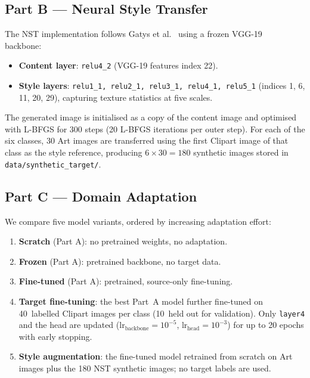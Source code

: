 \documentclass[conference]{IEEEtran}
\begin{document}
\subsection{Part B — Neural Style Transfer}

The NST implementation follows Gatys et al.~\cite{gatys2016nst} using a frozen
VGG-19~\cite{simonyan2015vgg} backbone:

\begin{itemize}
  \item \textbf{Content layer}: \texttt{relu4\_2} (VGG-19 features index 22).
  \item \textbf{Style layers}: \texttt{relu1\_1, relu2\_1, relu3\_1, relu4\_1, relu5\_1}
        (indices 1, 6, 11, 20, 29), capturing texture statistics at five scales.
\end{itemize}

The generated image is initialised as a copy of the content image and optimised
with L-BFGS for 300 steps (20 L-BFGS iterations per outer step).
For each of the six classes, 30 Art images are transferred using the first Clipart image
of that class as the style reference, producing $6 \times 30 = 180$ synthetic images
stored in \texttt{data/synthetic\_target/}.

\subsection{Part C — Domain Adaptation}

We compare five model variants, ordered by increasing adaptation effort:

\begin{enumerate}
  \item \textbf{Scratch} (Part A): no pretrained weights, no adaptation.
  \item \textbf{Frozen} (Part A): pretrained backbone, no target data.
  \item \textbf{Fine-tuned} (Part A): pretrained, source-only fine-tuning.
  \item \textbf{Target fine-tuning}: the best Part~A model further fine-tuned on
        40~labelled Clipart images per class (10~held out for validation).
        Only \texttt{layer4} and the head are updated ($\text{lr}_{\text{backbone}} = 10^{-5}$,
        $\text{lr}_{\text{head}} = 10^{-3}$) for up to 20 epochs with early stopping.
  \item \textbf{Style augmentation}: the fine-tuned model retrained from scratch on
        Art images plus the 180 NST synthetic images; no target labels are used.
\end{enumerate}
\end{document}
